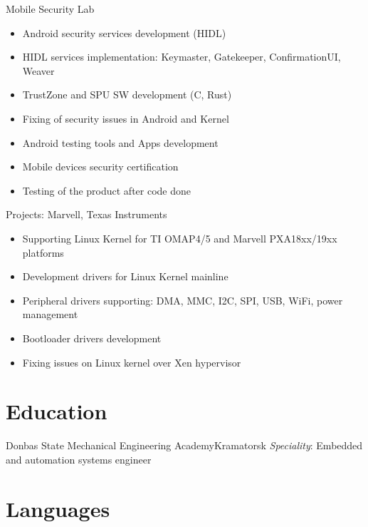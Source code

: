 \documentclass[11pt,a4paper]{moderncv}
\begin{document}
  {Mobile Security Lab{}
   \begin{itemize}
     \item Android security services development (HIDL)
     \item HIDL services implementation: Keymaster, Gatekeeper, ConfirmationUI, Weaver
     \item TrustZone and SPU SW development (C, Rust)
     \item Fixing of security issues in Android and Kernel
     \item Android testing tools and Apps development
     \item Mobile devices security certification
     \item Testing of the product after code done
   \end{itemize}}
  {Projects: Marvell, Texas Instruments{}
  \begin{itemize}
     \item Supporting Linux Kernel for TI OMAP4/5 and Marvell PXA18xx/19xx platforms
     \item Development drivers for Linux Kernel mainline
     \item Peripheral drivers supporting: DMA, MMC, I2C, SPI, USB, WiFi, power management
     \item Bootloader drivers development
     \item Fixing issues on Linux kernel over Xen hypervisor
  \end{itemize}}

\section{Education}

  {Donbas State Mechanical Engineering Academy}{Kramatorsk}{}
  {\textit{Speciality}: Embedded and automation systems engineer}


\section{Languages}

\end{document}

